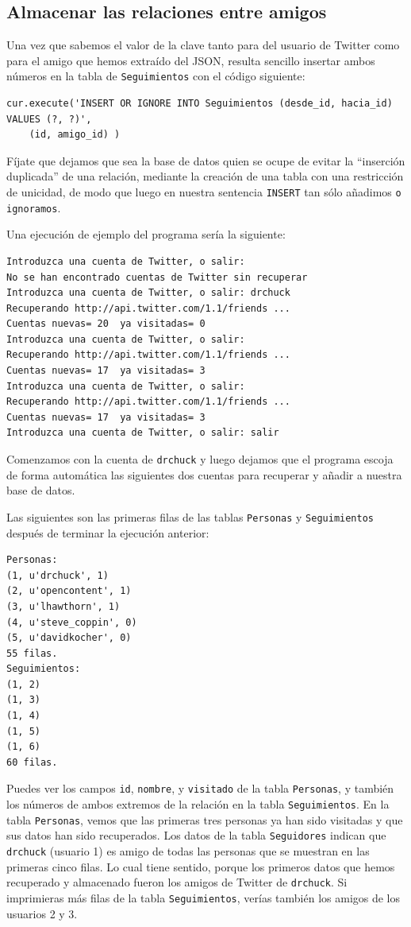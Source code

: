 \subsection{Almacenar las relaciones entre amigos}

Una vez que sabemos el valor de la clave tanto para del usuario de Twitter
como para el amigo que hemos extraído del JSON, resulta sencillo insertar
ambos números en la tabla de {\tt Seguimientos}
con el código siguiente:

\beforeverb
\begin{verbatim}
cur.execute('INSERT OR IGNORE INTO Seguimientos (desde_id, hacia_id) VALUES (?, ?)',
    (id, amigo_id) )
\end{verbatim}
\afterverb
%
Fíjate que dejamos que sea la base de datos quien se ocupe de evitar la ``inserción duplicada''
de una relación, mediante la creación de una tabla con una restricción de unicidad, de modo que
luego en nuestra sentencia {\tt INSERT} tan sólo añadimos {\tt o ignoramos}.

Una ejecución de ejemplo del programa sería la siguiente:

\beforeverb
\begin{verbatim}
Introduzca una cuenta de Twitter, o salir:
No se han encontrado cuentas de Twitter sin recuperar
Introduzca una cuenta de Twitter, o salir: drchuck
Recuperando http://api.twitter.com/1.1/friends ...
Cuentas nuevas= 20  ya visitadas= 0
Introduzca una cuenta de Twitter, o salir: 
Recuperando http://api.twitter.com/1.1/friends ...
Cuentas nuevas= 17  ya visitadas= 3
Introduzca una cuenta de Twitter, o salir:
Recuperando http://api.twitter.com/1.1/friends ...
Cuentas nuevas= 17  ya visitadas= 3
Introduzca una cuenta de Twitter, o salir: salir
\end{verbatim}
\afterverb
%
Comenzamos con la cuenta de {\tt drchuck} y luego dejamos que el programa
escoja de forma automática las siguientes dos cuentas para recuperar y añadir
a nuestra base de datos.

Las siguientes son las primeras filas de las tablas {\tt Personas}
y {\tt Seguimientos} después de terminar la ejecución anterior:

\beforeverb
\begin{verbatim}
Personas:
(1, u'drchuck', 1)
(2, u'opencontent', 1)
(3, u'lhawthorn', 1)
(4, u'steve_coppin', 0)
(5, u'davidkocher', 0)
55 filas.
Seguimientos:
(1, 2)
(1, 3)
(1, 4)
(1, 5)
(1, 6)
60 filas.
\end{verbatim}
\afterverb
%
Puedes ver los campos {\tt id}, {\tt nombre}, y {\tt visitado} de la
tabla {\tt Personas}, y también los números de ambos extremos
de la relación en la tabla {\tt Seguimientos}.
En la tabla {\tt Personas}, vemos que las primeras tres personas
ya han sido visitadas y que sus datos han sido recuperados.
Los datos de la tabla {\tt Seguidores} indican que
{\tt drchuck} (usuario 1) es amigo de todas las personas que se muestran en las primeras
cinco filas. Lo cual tiene sentido, porque
los primeros datos que hemos recuperado y almacenado fueron los amigos de Twitter de
{\tt drchuck}. Si imprimieras más filas de la tabla {\tt Seguimientos},
verías también los amigos de los usuarios 2 y 3.

